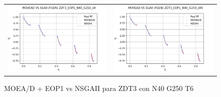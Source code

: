 \begin{figure}[H]
\begin{tabular}{c c}
    \includegraphics[scale=0.5]{figures/ZDT3_EOP1_N40_G250_T6/s9_comp.png} &
    \includegraphics[scale=0.5]{figures/ZDT3_EOP1_N40_G250_T6/s99_comp.png}\\
    \end{tabular}
    \caption{\centering MOEA/D + EOP1 vs NSGAII para ZDT3 con N40 G250 T6}
    \label{fig:5}
\end{figure}

